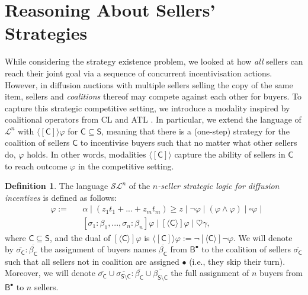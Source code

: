 \documentclass[letterpaper]{article} %
\theoremstyle{definition}
\newtheorem{definition}{Definition}
\begin{document}
\section{Reasoning About Sellers' Strategies}
While considering the strategy existence problem, we looked at how \textit{all} sellers can reach their joint goal via a sequence of concurrent incentivisation actions. However, in diffusion auctions with multiple sellers selling the copy of the same item, sellers and \textit{coalitions} thereof may compete against each other for buyers. To capture this strategic competitive setting,  
we introduce a modality inspired by coalitional operators from %
CL \cite{pauly02} and %
ATL \cite{alur2002}. In particular, we extend the language of $\mathcal{L}^n$ with $\langle \! [ \mathsf{C} ] \! \rangle \varphi$ for $\mathsf{C} \subseteq \mathsf{S}$, meaning that there is a (one-step) strategy for the coalition of sellers $\mathsf{C}$ to incentivise buyers such that no matter what other sellers do, $\varphi$ holds. In other words, modalities $\langle \! [ \mathsf{C} ] \! \rangle$ capture the ability of sellers in $\mathsf{C}$ to reach %
outcome $\varphi$ in the competitive setting.

\begin{definition}
The language $\mathcal{SL}^n$ of the \emph{$n$-seller strategic logic for diffusion incentives} %
is defined as follows:
    \begin{align*}
    &\varphi:= &&\alpha\mid %
    (z_1 t_1 + ...+z_m t_m) \geqslant z  \mid \lnot \varphi  \mid (\varphi \land \varphi) %
    \mid \square\varphi \mid \\
    & &&[\sigma_1: \beta_1, ..., \sigma_n: \beta_n] \varphi \mid [ \! \langle \mathsf{C} \rangle \! ] \varphi \mid  \heartsuit\gamma,
\end{align*}
where $\mathsf{C} \subseteq \mathsf{S}$, and the dual of $[ \! \langle \mathsf{C} \rangle \! ] \varphi$ is $\langle \! [\mathsf{C}] \! \rangle \varphi:= \lnot [ \! \langle \mathsf{C} \rangle \! ] \lnot \varphi$. We will denote by $\overline{\sigma_{\mathsf{C}}}: \overline{\beta_{\mathsf{C}}}$ the assignment of buyers names $\overline{\beta_{\mathsf{C}}}$ from $\mathsf{B}^\bullet$ to the coalition of sellers $\overline{\sigma_{\mathsf{C}}}$ such that all sellers not in coalition are assigned $\bullet$ (i.e., they skip their turn). Moreover, we will denote ${\overline{\sigma_\mathsf{C}}\cup \overline{\sigma_{\mathsf{S \setminus C}}}:\overline{\beta_\mathsf{C}}\cup \overline{\beta_{\mathsf{S \setminus C}}}}$ the full assignment of $n$ buyers from $\mathsf{B}^\bullet$ to $n$ sellers.
\end{definition}
\end{document}
